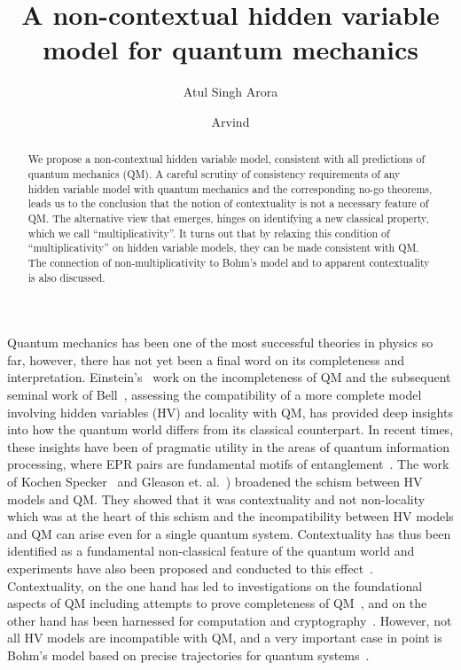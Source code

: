 \documentclass[british,aps,prl,superscriptaddress,nofootinbib,times,reprint]{revtex4-1}
\theoremstyle{plain}
\theoremstyle{plain}
\theoremstyle{definition}
\theoremstyle{remark}
\theoremstyle{remark}
\theoremstyle{remark}
\theoremstyle{plain}
\theoremstyle{plain}
\theoremstyle{plain}
\theoremstyle{definition}
\theoremstyle{definition}
\begin{document}
\title{A non-contextual hidden variable model for quantum mechanics}
\author{Atul Singh Arora}
%
\author{Arvind}
%
\begin{abstract}
We propose a non-contextual hidden variable model,
consistent with all predictions of quantum
mechanics (QM).  A careful scrutiny of consistency
requirements of any hidden variable model with
quantum mechanics and the corresponding no-go
theorems, leads us to the conclusion that the
notion of contextuality is not a necessary feature
of QM.  The alternative view that emerges, hinges
on identifying a new classical property, which we
call ``multiplicativity''.  It turns out that by
relaxing this condition of ``multiplicativity'' on
hidden variable models, they can be made
consistent with QM.  The connection of
non-multiplicativity to Bohm's model and to
apparent contextuality is also discussed.
\end{abstract}
\pacs{}
\maketitle
Quantum mechanics has been one of the most
successful theories in physics so far, however,
there has not yet been a final word on its
completeness and interpretation.
Einstein's~\cite{EinsteinEPR} work on the
incompleteness of QM and the subsequent seminal
work of Bell~\cite{Bell1964}, assessing the
compatibility of a more complete model involving
hidden variables (HV) and locality with QM, has
provided deep insights into  how the quantum world
differs from its classical counterpart.  In recent
times, these insights have been of pragmatic
utility in the areas of quantum information
processing, where EPR pairs are fundamental motifs
of entanglement~\cite{Ekert,PironioRndmnssCrtfcn,NielsenChuang}.
The work of  Kochen Specker~\cite{KochenSpecker}
and Gleason et.
al.~\cite{Gleason,BellOnHiddenVariables,Peres,Mermin})
broadened the schism between  HV models and QM.
They showed that it was contextuality and not
non-locality which was at the heart of this schism
and the incompatibility between HV models and QM
can arise even for a single quantum system.
Contextuality has thus been identified as a
fundamental non-classical feature of the quantum
world and experiments have also been proposed and
conducted to this effect~\cite{SimonContExpProp,
HuangContExp}.
Contextuality, on the one hand has led to
investigations on the foundational aspects of
QM including attempts to prove completeness of QM~\cite{PawelCntxClsscl,CabelloMmryQM}, and on the other
hand has been harnessed for computation and
cryptography~\cite{HowardCntxCmptn,CabelloCntxScrt}.
However, not all HV
models are incompatible with QM, and a very
important case in point is  Bohm's model based on
precise trajectories for quantum
systems~\cite{Bohm1,Bohm2}. 
\end{document}
